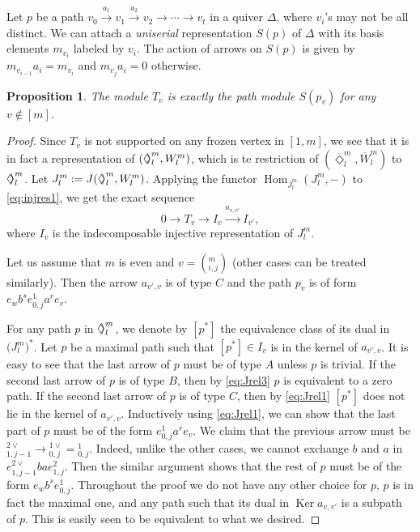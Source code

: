 \documentclass{amsart}
\newtheorem{proposition}[theorem]{Proposition}
\theoremstyle{definition}
\theoremstyle{remark}
\numberwithin{equation}{section}
\DeclareMathOperator{\Hom}{Hom}
\DeclareMathOperator{\Ker}{Ker}
\newcommand{\opp}{{\operatorname{op}}}
\newcommand{\br}[1]{\overline{#1}}
\newcommand{\Diamondsh}{\mathrel{\Diamond\!\!\raisebox{0.45pt}{$\rangle$}}}
\begin{document}
Let $p$ be a path $v_0 \xrightarrow{a_1} v_1 \xrightarrow{a_2} v_2 \xrightarrow{}\cdots\xrightarrow{} v_t$ in a quiver $\Delta$,
where $v_i$'s may not be all distinct.
We can attach a {\em uniserial} representation $S(p)$ of $\Delta$ with its basis elements $m_{v_i}$ labeled by $v_i$.
The action of arrows on $S(p)$ is given by $m_{v_{i-1}}a_i = m_{v_i}$ and $m_{v_j}a_i = 0$ otherwise.
\begin{proposition} \label{P:Tv} The module $T_v$ is exactly the path module $S(p_v)$ for any $v\notin [m]$.
\end{proposition}
\begin{proof}	Since $T_v$ is not supported on any frozen vertex in $[1,m]$, we see that it is in fact a representation of $(\Diamondsh_l^m,W_l^m)$, which is te restriction of $(\br{\Diamond}_l^m,\br{W}_l^m)$ to $\Diamondsh_l^m$.
Let $J_l^m:=J(\Diamondsh_l^m,W_l^m)$.
Applying the functor $\Hom_{\br{J}_l^m}(J_l^m,-)$ to \eqref{eq:injres1}, we get the exact sequence
$$0\to T_v \to I_v \xrightarrow{a_{v,v'}} I_{v'},$$
where $I_v$ is the indecomposable injective representation of $J_l^m$.
	
Let us assume that $m$ is even and $v=(_{i,j}^m)$ (other cases can be treated similarly).
Then the arrow $a_{v',v}$ is of type $C$ and the path $p_v$ is of form $e_wb^se_{0,j}^1 a^re_v$.

For any path $p$ in ${\Diamondsh}_l^m$, we denote by $[p^*]$ the equivalence class of its dual in $\big({J}_l^m\big)^*$.
Let $p$ be a maximal path such that $[p^*]\in I_v$ is in the kernel of $a_{v',v}$.
It is easy to see that the last arrow of $p$ must be of type $A$ unless $p$ is trivial.
If the second last arrow of $p$ is of type $B$, then by \eqref{eq:Jrel3} $p$ is equivalent to a zero path.
If the second last arrow of $p$ is of type $C$, then by \eqref{eq:Jrel1} $[p^*]$ does not lie in the kernel of $a_{v',v}$.
Inductively using \eqref{eq:Jrel1}, we can show that the last part of $p$ must be of the form $e_{0,j}^1 a^r e_v$. 
We claim that the previous arrow must be $_{1,j-1}^{2\vee} \to {_{0,j}^{1\vee}}={_{0,j}^1}$.
Indeed, unlike the other cases, we cannot exchange $b$ and $a$ in $e_{1,j-1}^{2\vee}bae_{1,j}^2$.  
Then the similar argument shows that the rest of $p$ must be of the form $e_wb^se_{0,j}^1$.
Throughout the proof we do not have any other choice for $p$, $p$ is in fact the maximal one,
and any path such that its dual in $\Ker a_{v,v'}$ is a subpath of $p$. 
This is easily seen to be equivalent to what we desired.   	
\end{proof}
\end{document}
